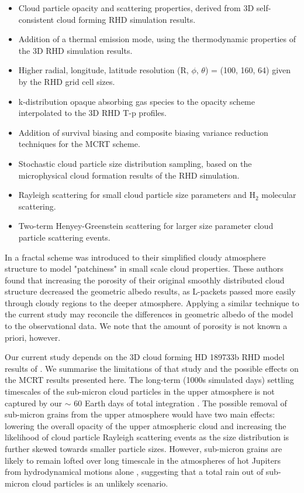 \documentclass{aa}
\begin{document}
\begin{itemize}
\item Cloud particle opacity and scattering properties, derived from 3D self-consistent cloud forming RHD simulation results.
\item Addition of a thermal emission mode, using the thermodynamic properties of the 3D RHD simulation results.
\item Higher radial, longitude, latitude resolution (R, $\phi$, $\theta$) = (100, 160, 64) given by the RHD grid cell sizes.
\item k-distribution opaque absorbing gas species to the opacity scheme interpolated to the 3D RHD T-p profiles.
\item Addition of survival biasing and composite biasing variance reduction techniques for the MCRT scheme.
\item Stochastic cloud particle size distribution sampling, based on the microphysical cloud formation results of the RHD simulation.
\item Rayleigh scattering for small cloud particle size parameters and H$_{2}$ molecular scattering.
\item Two-term Henyey-Greenstein scattering for larger size parameter cloud particle scattering events.
\end{itemize}

In \citet{Hood2008} a fractal scheme was introduced to their simplified cloudy atmosphere structure to model "patchiness" in small scale cloud properties.
These authors found that increasing the porosity of their original smoothly distributed cloud structure decreased the geometric albedo results, as L-packets passed more easily through cloudy regions to the deeper atmosphere.
Applying a similar technique to the current study may reconcile the differences in geometric albedo of the model to the observational data.
We note that the amount of porosity is not known a priori, however.

Our current study depends on the 3D cloud forming HD 189733b RHD model results of \citet{Lee2016}.
We summarise the limitations of that study and the possible effects on the MCRT results presented here.
The long-term (1000s simulated days) settling timescales of the sub-micron cloud particles in the upper atmosphere is not captured by our $\sim$ 60 Earth days of total integration \citep[e.g.][]{Woitke2003,Parmentier2013}.
The possible removal of sub-micron grains from the upper atmosphere would have two main effects:
lowering the overall opacity of the upper atmospheric cloud and increasing the likelihood of cloud particle Rayleigh scattering events as the size distribution is further skewed towards smaller particle sizes.
However, sub-micron grains are likely to remain lofted over long timescale in the atmospheres of hot Jupiters from hydrodynamical motions alone \citep{Parmentier2013}, suggesting that a total rain out of sub-micron cloud particles is an unlikely scenario.
\end{document}
